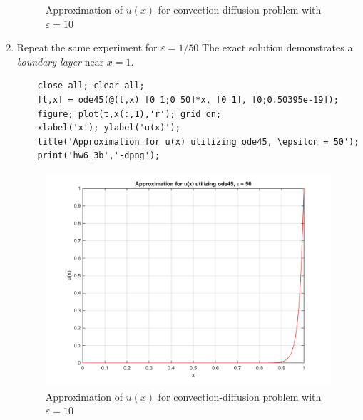 \documentclass[14pt,a4paper]{article}
\begin{document}
\begin{enumerate}
\begin{figure}[htp]
		\caption{Approximation of $u(x)$ for convection-diffusion problem with $\varepsilon = 10$}
	\end{figure}
	
	\label{3b}
	\item Repeat the same experiment for $\varepsilon = 1/50$ The exact solution demonstrates a \textit{boundary layer} near $x =1$.
	\begin{lstlisting}
	close all; clear all;
	[t,x] = ode45(@(t,x) [0 1;0 50]*x, [0 1], [0;0.50395e-19]);
	figure; plot(t,x(:,1),'r'); grid on;
	xlabel('x'); ylabel('u(x)');
	title('Approximation for u(x) utilizing ode45, \epsilon = 50');
	print('hw6_3b','-dpng');
	\end{lstlisting}
	\begin{figure}[htp]
		\centering
		\includegraphics[scale=0.5]{hw6_3b.png}
		\caption{Approximation of $u(x)$ for convection-diffusion problem with $\varepsilon = 10$}
	\end{figure}
	

\end{enumerate}
\end{document}
